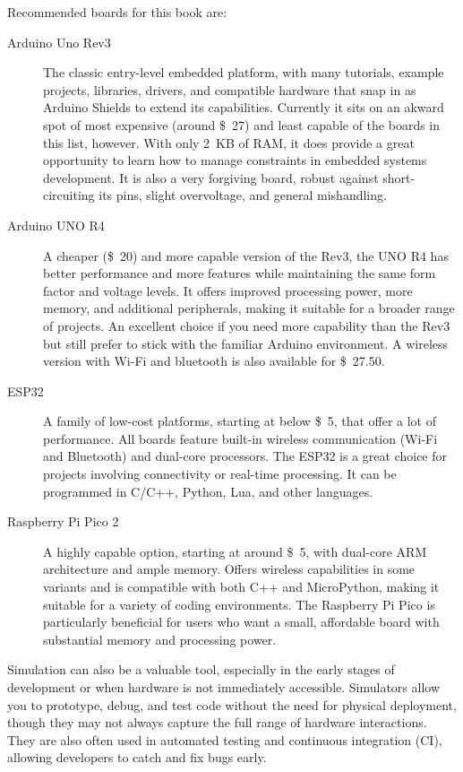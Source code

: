 Recommended boards for this book are:
\begin{description}
\item[Arduino Uno Rev3]
  The classic entry-level embedded platform, with many tutorials, example projects, libraries, drivers, and compatible hardware that snap in as Arduino Shields to extend its capabilities.
  Currently it sits on an akward spot of most expensive (around \SI{27}[\$]{}) and least capable of the boards in this list, however.
  With only \SI{2}{KB} of RAM, it does provide a great opportunity to learn how to manage constraints in embedded systems development.
  It is also a very forgiving board, robust against short-circuiting its pins, slight overvoltage, and general mishandling.
\item[Arduino UNO R4]
  A cheaper (\SI{20}[\$]{}) and more capable version of the Rev3, the UNO R4 has better performance and more features while maintaining the same form factor and voltage levels.
  It offers improved processing power, more memory, and additional peripherals, making it suitable for a broader range of projects.
  An excellent choice if you need more capability than the Rev3 but still prefer to stick with the familiar Arduino environment.
  A wireless version with Wi-Fi and bluetooth is also available for \SI{27.50}[\$]{}.
\item[ESP32]
  A family of low-cost platforms, starting at below \SI{5}[\$]{}, that offer a lot of performance.
  All boards feature built-in wireless communication (Wi-Fi and Bluetooth) and dual-core processors.
  The ESP32 is a great choice for projects involving connectivity or real-time processing.
  It can be programmed in C/C++, Python, Lua, and other languages.
\item[Raspberry Pi Pico 2]
  A highly capable option, starting at around \SI{5}[\$]{}, with dual-core ARM architecture and ample memory.
  Offers wireless capabilities in some variants and is compatible with both C++ and MicroPython, making it suitable for a variety of coding environments.
  The Raspberry Pi Pico is particularly beneficial for users who want a small, affordable board with substantial memory and processing power.
\end{description}

Simulation can also be a valuable tool, especially in the early stages of development or when hardware is not immediately accessible.
Simulators allow you to prototype, debug, and test code without the need for physical deployment, though they may not always capture the full range of hardware interactions.
They are also often used in automated testing and continuous integration (CI), allowing developers to catch and fix bugs early.


